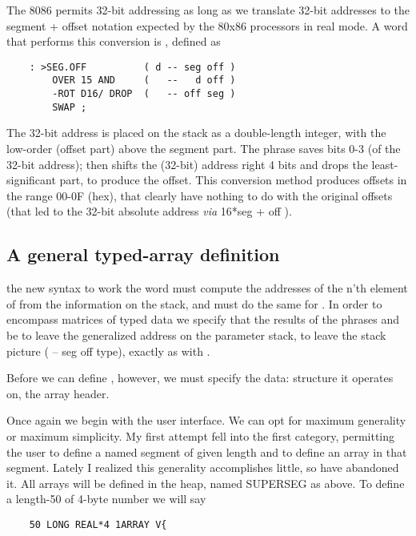 The 8086 permits 32-bit addressing as long as we translate 32-bit addresses to the segment + offset notation expected by the 80x86 processors in real mode. A word that performs this conversion is , defined as

\begin{lstlisting}
    : >SEG.OFF          ( d -- seg off )
        OVER 15 AND     (   --   d off )
        -ROT D16/ DROP  (   -- off seg )
        SWAP ;
\end{lstlisting}

The 32-bit address is placed on the stack as a double-length integer, with the low-order (\ie offset part) above the segment part. The phrase  saves bits 0-3 (of the 32-bit address);  then shifts the (32-bit) address right 4 bits and drops the least-significant part, to produce the offset. This conversion method produces offsets in the range 00-0F (hex), that clearly have nothing to do with the original offsets (that led to the 32-bit absolute address \textit{via} 16*seg + off ).

\subsection{A general typed-array definition}
 the new syntax to work the word \bc{\}} must compute the addresses of the n'th element of  from the information on the stack, and \bc{\}\}} must do the same for . In order to encompass matrices of typed data we specify that the results of the phrases and  be to leave the generalized address on the parameter stack, \ie to leave the stack picture ( -- seg off type), exactly as with .

Before we can define \bc{\}}, however, we must specify the data: structure it operates on, \ie the array header.

Once again we begin with the user interface. We can opt for maximum generality or maximum simplicity. My first attempt fell into the first category, permitting the user to define a named segment of given length and to define an array in that segment. Lately I realized this generality accomplishes little, so have abandoned it. All arrays will be defined in the heap, named SUPERSEG as above. To define a length-50  of 4-byte number we will say

\begin{lstlisting}
    50 LONG REAL*4 1ARRAY V{
\end{lstlisting}

